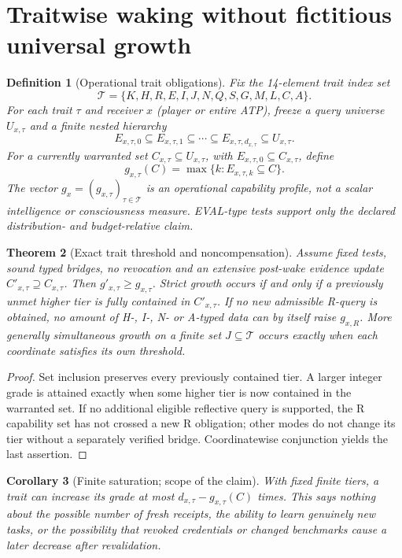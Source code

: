 \documentclass[11pt,letterpaper]{article}
\newtheorem{theorem}{Theorem}[section]
\newtheorem{corollary}[theorem]{Corollary}
\newtheorem{definition}[theorem]{Definition}
\newcommand{\Tp}{\mathcal T}
\begin{document}
\section{Traitwise waking without fictitious universal growth}\label{gl-first-W1-s7}
\begin{definition}[Operational trait obligations]
Fix the 14-element trait index set
\[\Tp=\{K,H,R,E,I,J,N,Q,S,G,M,L,C,A\}.\]
For each trait $\tau$ and receiver $x$ (player or entire ATP), freeze a query universe $U_{x,\tau}$ and a finite nested hierarchy
\[
E_{x,\tau,0}\subseteq E_{x,\tau,1}\subseteq\cdots\subseteq E_{x,\tau,d_{x,\tau}}\subseteq U_{x,\tau}.
\]
For a currently warranted set $C_{x,\tau}\subseteq U_{x,\tau}$, with $E_{x,\tau,0}\subseteq C_{x,\tau}$, define
\[
 g_{x,\tau}(C)=\max\{k:E_{x,\tau,k}\subseteq C\}.
\]
The vector $g_x=(g_{x,\tau})_{\tau\in\Tp}$ is an operational capability profile, not a scalar intelligence or consciousness measure. EVAL-type tests support only the declared distribution- and budget-relative claim.
\end{definition}
\begin{theorem}[Exact trait threshold and noncompensation]\label{thm:threshold}
Assume fixed tests, sound typed bridges, no revocation and an extensive post-wake evidence update $C'_{x,\tau}\supseteq C_{x,\tau}$. Then $g'_{x,\tau}\ge g_{x,\tau}$. Strict growth occurs if and only if a previously unmet higher tier is fully contained in $C'_{x,\tau}$. If no new admissible R-query is obtained, no amount of H-, I-, N- or A-typed data can by itself raise $g_{x,R}$. More generally simultaneous growth on a finite set $J\subseteq\Tp$ occurs exactly when each coordinate satisfies its own threshold.
\end{theorem}
\begin{proof}
Set inclusion preserves every previously contained tier. A larger integer grade is attained exactly when some higher tier is now contained in the warranted set. If no additional eligible reflective query is supported, the R capability set has not crossed a new R obligation; other modes do not change its tier without a separately verified bridge. Coordinatewise conjunction yields the last assertion.
\end{proof}
\begin{corollary}[Finite saturation; scope of the claim]
With fixed finite tiers, a trait can increase its grade at most $d_{x,\tau}-g_{x,\tau}(C)$ times. This says nothing about the possible number of fresh receipts, the ability to learn genuinely new tasks, or the possibility that revoked credentials or changed benchmarks cause a later \emph{decrease} after revalidation.
\end{corollary}
\end{document}
